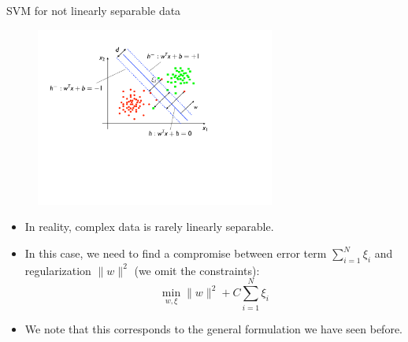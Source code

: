 \documentclass[xcolor=pdftex,dvipsnames,table]{beamer}
\begin{document}
\begin{frame}{SVM for not linearly separable data}
	\begin{figure}[htb]
		\includegraphics[width=0.7\textwidth]{../graphics/SVM3.pdf}
	\end{figure}
	\begin{itemize}
		\item In reality, complex data is rarely linearly separable.
		\item In this case, we need to find a compromise between error term $\sum_{i=1}^{N}\xi_i$ and regularization $\|w\|^2$ (we omit the constraints):
		\begin{equation*}
			\min_{w,\xi} \|w\|^2 + C \sum_{i=1}^{N}\xi_i
		\end{equation*}
		\item We note that this corresponds to the general formulation we have seen before.
	\end{itemize}
\end{frame}
\end{document}
